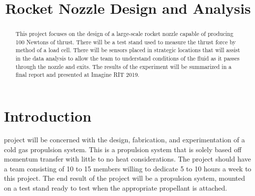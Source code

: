 \documentclass[conference]{IEEEtran} %
\title{Rocket Nozzle Design and Analysis}
\author{
  \IEEEauthorblockN{%
    James~Emerson~Parkus\IEEEauthorrefmark{1},  %
    David~Breen\IEEEauthorrefmark{2}
  }
  \IEEEauthorblockA{%
    RIT Space Exploration, Rochester Institute of Technology \\ %
    Rochester, N.Y. \\
    Email:
    \IEEEauthorrefmark{1}jep7631@rit.edu,
    \IEEEauthorrefmark{2}djb1410@rit.edu
  }

}
\begin{document}
\maketitle%

\begin{abstract}
  This project focuses on the design of a large-scale rocket nozzle capable of producing 100 Newtons of thrust. There will be a test stand used to measure the thrust force by method of a load cell.
  There will be sensors placed in strategic locations that will assist in the data analysis to allow the team to understand conditions of the fluid as it passes through the nozzle and exits. The results
  of the experiment will be summarized in a final report and presented at Imagine RIT 2019.
\end{abstract}

\label{sec:nomenclature}
\newcommand{\nomunit}[1]{%
\renewcommand{\nomentryend}{\hspace*{\fill}#1}}
\renewcommand{\nompreamble}{

  }
\printnomenclature{}

\section{Introduction}\label{sec:introduction}
 project will be concerned with the design, fabrication, and experimentation of a cold gas propulsion system. This is a propulsion system
that is solely based off momentum transfer with little to no heat considerations. The project should have a team consisting of 10 to 15 members willing to dedicate
5 to 10 hours a week to this project. The end result of the project will be a propulsion system, mounted on a test stand ready to test when the appropriate propellant
is attached.
\end{document}
